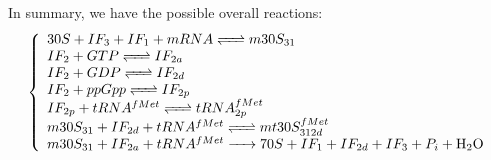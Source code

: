 \medskip

In summary, we have the possible overall reactions:
$$
  \left\{
    \begin{array}{l}
      \reactionRev{30S+IF_3+IF_1+mRNA}{m30S_{31}}{}{} \\
      \reactionRev{IF_2+GTP}{IF_{2a}}{}{} \\
      \reactionRev{IF_2+GDP}{IF_{2d}}{}{} \\
      \reactionRev{IF_2+ppGpp}{IF_{2p}}{}{} \\
      \reactionRev{IF_{2p}+tRNA^{fMet}}{tRNA_{2p}^{fMet}}{}{}{} \\
      \reactionRev{m30S_{31}+IF_{2d}+tRNA^{fMet}}{mt30S_{312d}^{fMet}}{}{}{} \\
      \reactionIrr{m30S_{31}+IF_{2a}+tRNA^{fMet}}{70S+IF_1+IF_{2d}+IF_3+P_i+\ce{H2O}}{}{}{} \\
    \end{array}
  \right.
$$






